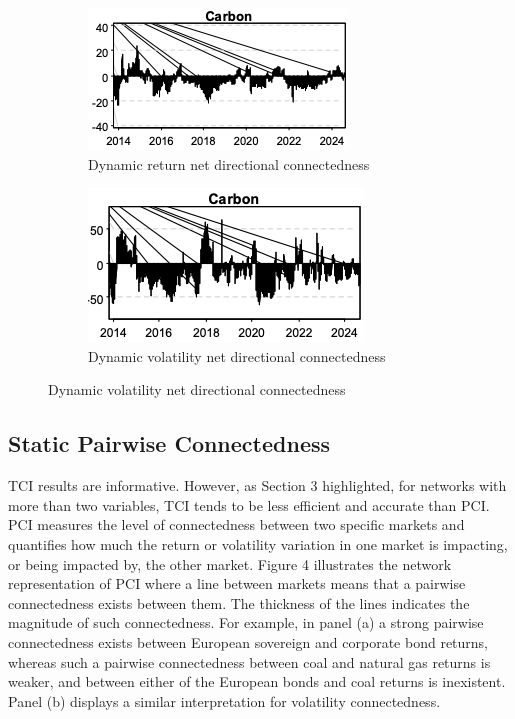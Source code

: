 \documentclass[preprint, 3p,
authoryear]{elsarticle} %
\begin{document}
\begin{figure}[H]
  \caption{Net Directional Connectedness between EUAs and other markets}
  \label{fig:NDC}
      \begin{subfigure}[b]{\textwidth}
      \centering
        \caption{Dynamic return net directional connectedness}
        \label{fig:dynretNDC}
        \includegraphics[width = 0.45\linewidth]{../figures/3a-DynRetNDC}
      \end{subfigure}
      \begin{subfigure}[b]{\textwidth}
        \centering
        \bigskip
        \caption{Dynamic volatility net directional connectedness}
        \label{fig:dynvolNDC}
        \includegraphics[width = 0.45\linewidth]{../figures/3b-DynVolNDC}
      \end{subfigure}
\end{figure}

\bigskip

\hypertarget{static-pairwise-connectedness}{%
\subsection{Static Pairwise
Connectedness}\label{static-pairwise-connectedness}}

TCI results are informative. However, as Section 3 highlighted, for
networks with more than two variables, TCI tends to be less efficient
and accurate than PCI. PCI measures the level of connectedness between
two specific markets and quantifies how much the return or volatility
variation in one market is impacting, or being impacted by, the other
market. Figure 4 illustrates the network representation of PCI where a
line between markets means that a pairwise connectedness exists between
them. The thickness of the lines indicates the magnitude of such
connectedness. For example, in panel (a) a strong pairwise connectedness
exists between European sovereign and corporate bond returns, whereas
such a pairwise connectedness between coal and natural gas returns is
weaker, and between either of the European bonds and coal returns is
inexistent. Panel (b) displays a similar interpretation for volatility
connectedness.
\end{document}
